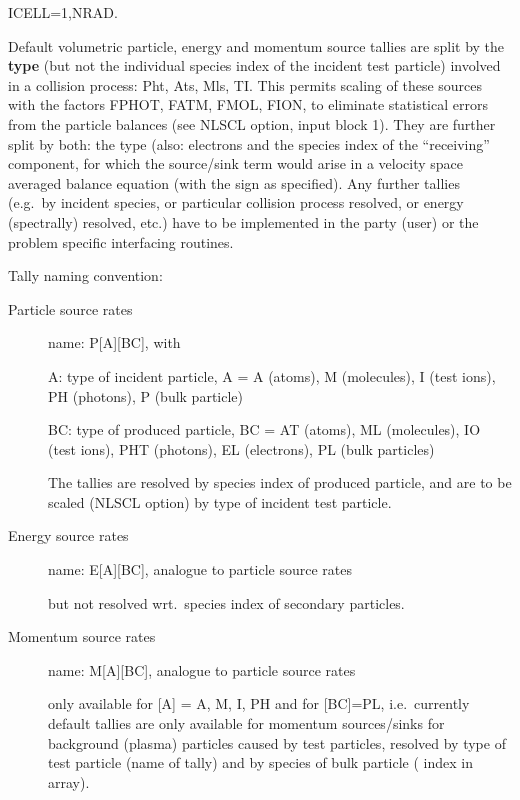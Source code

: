 ICELL=1,NRAD.
%

Default volumetric particle, energy and momentum source tallies are split by
the \textbf{type} (but not the individual species index of the incident test
particle) involved in a collision process: \ac{Pht}, \ac{Ats}, \ac{Mls},
\ac{TI}.
This permits scaling of these sources with the factors FPHOT, FATM, FMOL, FION,
to eliminate statistical errors from the particle balances (see NLSCL option,
input block 1).
They are further split by both:
the type (also: electrons and the species index of the ``receiving''
component, for which the source/sink term would arise in a velocity
space averaged balance equation (with the sign as specified).
Any further tallies (e.g.\ by incident species, or particular collision process
resolved, or energy (spectrally) resolved, etc.) have to be implemented in the
 party (user) or the problem specific interfacing routines.

Tally naming convention:
\begin{description}
  \item[Particle source rates]

        name: P[A][BC], with

        A: type of incident particle, A = A (atoms), M (molecules), I (test ions),
        PH (photons), P (bulk particle)

        BC: type of produced particle, BC = AT (atoms), ML (molecules), IO (test ions),
        PHT (photons), EL (electrons), PL (bulk particles)

        The tallies are resolved by species index of produced particle, and are to be
        scaled (NLSCL option) by type of incident test particle.
  \item[Energy source rates]

        name: E[A][BC], analogue to particle source rates

        but not resolved wrt.\ species index of secondary particles.
  \item[Momentum source rates]

        name: M[A][BC], analogue to particle source rates

        only available for [A] = A, M, I, PH  and for [BC]=PL, i.e.\ currently default
        tallies are only available for momentum sources/sinks for background (plasma)
        particles caused by test particles, resolved by type of test particle (name of
        tally) and by species of bulk particle ( index in array).
\end{description}

